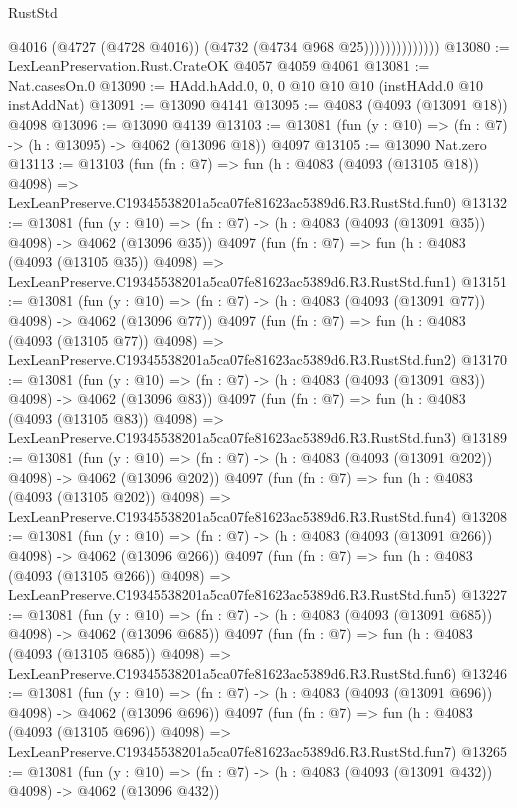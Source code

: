 \begin{lexlean}{RustStd}
\begin{coremodule}
                            @4016
                            (@4727 (@4728 @4016))
                            (@4732 (@4734 @968 @25))))))))))))))
@13080 := LexLeanPreservation.Rust.CrateOK @4057 @4059 @4061
@13081 := Nat.casesOn.{0}
@13090 := HAdd.hAdd.{0, 0, 0} @10 @10 @10 (instHAdd.{0} @10 instAddNat)
@13091 := @13090 @4141
@13095 := @4083 (@4093 (@13091 @18)) @4098
@13096 := @13090 @4139
@13103 := @13081 (fun (y : @10) => (fn : @7) -> (h : @13095) -> @4062 (@13096 @18)) @4097
@13105 := @13090 Nat.zero
@13113 := @13103
    (fun (fn : @7) =>
    fun (h : @4083 (@4093 (@13105 @18)) @4098) =>
    LexLeanPreserve.C19345538201a5ca07fe81623ac5389d6.R3.RustStd.fun0)
@13132 := @13081
    (fun (y : @10) => (fn : @7) -> (h : @4083 (@4093 (@13091 @35)) @4098) -> @4062 (@13096 @35))
    @4097
    (fun (fn : @7) =>
    fun (h : @4083 (@4093 (@13105 @35)) @4098) =>
    LexLeanPreserve.C19345538201a5ca07fe81623ac5389d6.R3.RustStd.fun1)
@13151 := @13081
    (fun (y : @10) => (fn : @7) -> (h : @4083 (@4093 (@13091 @77)) @4098) -> @4062 (@13096 @77))
    @4097
    (fun (fn : @7) =>
    fun (h : @4083 (@4093 (@13105 @77)) @4098) =>
    LexLeanPreserve.C19345538201a5ca07fe81623ac5389d6.R3.RustStd.fun2)
@13170 := @13081
    (fun (y : @10) => (fn : @7) -> (h : @4083 (@4093 (@13091 @83)) @4098) -> @4062 (@13096 @83))
    @4097
    (fun (fn : @7) =>
    fun (h : @4083 (@4093 (@13105 @83)) @4098) =>
    LexLeanPreserve.C19345538201a5ca07fe81623ac5389d6.R3.RustStd.fun3)
@13189 := @13081
    (fun (y : @10) => (fn : @7) -> (h : @4083 (@4093 (@13091 @202)) @4098) -> @4062 (@13096 @202))
    @4097
    (fun (fn : @7) =>
    fun (h : @4083 (@4093 (@13105 @202)) @4098) =>
    LexLeanPreserve.C19345538201a5ca07fe81623ac5389d6.R3.RustStd.fun4)
@13208 := @13081
    (fun (y : @10) => (fn : @7) -> (h : @4083 (@4093 (@13091 @266)) @4098) -> @4062 (@13096 @266))
    @4097
    (fun (fn : @7) =>
    fun (h : @4083 (@4093 (@13105 @266)) @4098) =>
    LexLeanPreserve.C19345538201a5ca07fe81623ac5389d6.R3.RustStd.fun5)
@13227 := @13081
    (fun (y : @10) => (fn : @7) -> (h : @4083 (@4093 (@13091 @685)) @4098) -> @4062 (@13096 @685))
    @4097
    (fun (fn : @7) =>
    fun (h : @4083 (@4093 (@13105 @685)) @4098) =>
    LexLeanPreserve.C19345538201a5ca07fe81623ac5389d6.R3.RustStd.fun6)
@13246 := @13081
    (fun (y : @10) => (fn : @7) -> (h : @4083 (@4093 (@13091 @696)) @4098) -> @4062 (@13096 @696))
    @4097
    (fun (fn : @7) =>
    fun (h : @4083 (@4093 (@13105 @696)) @4098) =>
    LexLeanPreserve.C19345538201a5ca07fe81623ac5389d6.R3.RustStd.fun7)
@13265 := @13081
    (fun (y : @10) => (fn : @7) -> (h : @4083 (@4093 (@13091 @432)) @4098) -> @4062 (@13096 @432))

\end{coremodule}
\end{lexlean}
